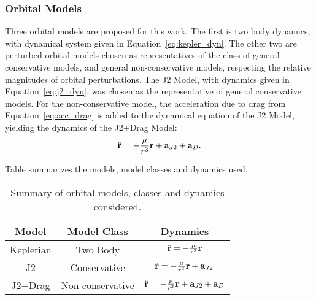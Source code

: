 
\subsubsection{Orbital Models}

Three orbital models are proposed for this work. The first is two body dynamics, with dynamical system given in Equation~\eqref{eq:kepler_dyn}. The other two are perturbed orbital models chosen as representatives of the class of general conservative models, and general non-conservative models, respecting the relative magnitudes of orbital perturbations. The J2 Model, with dynamics given in Equation~\eqref{eq:j2_dyn}, was chosen as the representative of general conservative models. For the non-conservative model, the acceleration due to drag from Equation~\eqref{eq:acc_drag} is added to the dynamical equation of the J2 Model, yielding the dynamics of the J2+Drag Model:
\begin{equation}
    \ddot{\mathbf{r}} = -\frac{\mu}{r^3} \mathbf{r} + \mathbf{a}_{J2} + \mathbf{a}_{D}.
\end{equation}

Table summarizes the models, model classes and dynamics used.

\begin{table}[htbp]
    \centering
    \begin{tabular}{ccc}\toprule
        Model & Model Class & Dynamics \\ \midrule
        Keplerian & Two Body & \(\ddot{\mathbf{r}} = -\frac{\mu}{r^3} \mathbf{r}\) \\
        J2 & Conservative & \(\ddot{\mathbf{r}} = -\frac{\mu}{r^3} \mathbf{r} + \mathbf{a}_{J2}\) \\
        J2+Drag & Non-conservative & \(\ddot{\mathbf{r}} = -\frac{\mu}{r^3} \mathbf{r} + \mathbf{a}_{J2} + \mathbf{a}_{D}\) \\ \bottomrule
    \end{tabular}
    \caption{Summary of orbital models, classes and dynamics considered.}
    \label{tab:orb_models}
\end{table}

